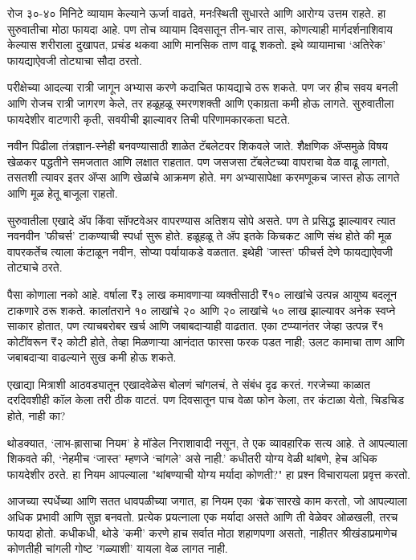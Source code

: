 रोज ३०-४० मिनिटे व्यायाम केल्याने ऊर्जा वाढते, मनःस्थिती सुधारते आणि आरोग्य उत्तम राहते. हा सुरुवातीचा मोठा फायदा आहे. पण तोच व्यायाम दिवसातून तीन-चार तास, कोणत्याही मार्गदर्शनाशिवाय केल्यास शरीराला दुखापत, प्रचंड थकवा आणि मानसिक ताण वाढू शकतो. इथे व्यायामाचा ‘अतिरेक’ फायद्याऐवजी तोट्याचा सौदा ठरतो.

परीक्षेच्या आदल्या रात्री जागून अभ्यास करणे कदाचित फायद्याचे ठरू शकते. पण जर हीच सवय बनली आणि रोजच रात्री जागरण केले, तर हळूहळू स्मरणशक्ती आणि एकाग्रता कमी होऊ लागते. सुरुवातीला फायदेशीर वाटणारी कृती, सवयीची झाल्यावर तिची परिणामकारकता घटते.

नवीन पिढीला तंत्रज्ञान-स्नेही बनवण्यासाठी शाळेत टॅबलेटवर शिकवले जाते. शैक्षणिक ॲप्समुळे विषय खेळकर पद्धतीने समजतात आणि लक्षात राहतात. पण जसजसा टॅबलेटच्या वापराचा वेळ वाढू लागतो, तसतशी त्यावर इतर ॲप्स आणि खेळांचे आक्रमण होते. मग अभ्यासापेक्षा करमणूकच जास्त होऊ लागते आणि मूळ हेतू बाजूला राहतो.

सुरुवातीला एखादे ॲप किंवा सॉफ्टवेअर वापरण्यास अतिशय सोपे असते. पण ते प्रसिद्ध झाल्यावर त्यात नवनवीन 'फीचर्स' टाकण्याची स्पर्धा सुरू होते. हळूहळू ते ॲप इतके किचकट आणि संथ होते की मूळ वापरकर्तेच त्याला कंटाळून नवीन, सोप्या पर्यायाकडे वळतात. इथेही 'जास्त' फीचर्स देणे फायद्याऐवजी तोट्याचे ठरते.

पैसा कोणाला नको आहे. वर्षाला ₹३ लाख कमावणाऱ्या व्यक्तीसाठी ₹१० लाखांचे उत्पन्न आयुष्य बदलून टाकणारे ठरू शकते. कालांतराने १० लाखांचे २० आणि २० लाखांचे ५० लाख झाल्यावर अनेक स्वप्ने साकार होतात, पण त्याचबरोबर खर्च आणि जबाबदाऱ्याही वाढतात. एका टप्प्यानंतर जेव्हा उत्पन्न ₹१ कोटींवरून ₹२ कोटी होते, तेव्हा मिळणाऱ्या आनंदात फारसा फरक पडत नाही; उलट कामाचा ताण आणि जबाबदाऱ्या वाढल्याने सुख कमी होऊ शकते.

एखाद्या मित्राशी आठवड्यातून एखादवेळेस बोलणं चांगलचं, ते संबंध दृढ करतं. गरजेच्या काळात दरदिवशीही कॉल केला तरी ठीक वाटतं. पण दिवसातून पाच वेळा फोन केला, तर कंटाळा येतो, चिडचिड होते, नाही का?

थोडक्यात, ‘लाभ-ह्रासाचा नियम’ हे मॉडेल निराशावादी नसून, ते एक व्यावहारिक सत्य आहे. ते आपल्याला शिकवते की, ‘नेहमीच ‘जास्त’ म्हणजे ‘चांगले’ असे नाही.’ कधीतरी योग्य वेळी थांबणे, हेच अधिक फायदेशीर ठरते. हा नियम आपल्याला "थांबण्याची योग्य मर्यादा कोणती?" हा प्रश्न विचारायला प्रवृत्त करतो.

आजच्या स्पर्धेच्या आणि सतत धावपळीच्या जगात, हा नियम एका ‘ब्रेक’सारखे काम करतो, जो आपल्याला अधिक प्रभावी आणि सुज्ञ बनवतो. प्रत्येक प्रयत्नाला एक मर्यादा असते आणि ती वेळेवर ओळखली, तरच फायदा होतो. कधीकधी, थोडे 'कमी' करणे हाच सर्वात मोठा शहाणपणा असतो, नाहीतर श्रीखंडाप्रमाणेच कोणतीही चांगली गोष्ट 'गळ्याशी' यायला वेळ लागत नाही.

